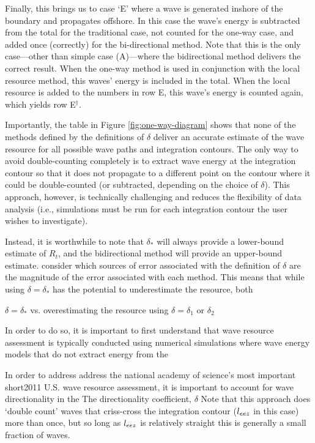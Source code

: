 Finally, this brings us to case `E' where a wave is generated inshore of the boundary and propagates offshore. In this case the wave's energy is subtracted from the total for the traditional case, not counted for the one-way case, and added once (correctly) for the bi-directional method. Note that this is the only case—other than simple case (A)—where the bidirectional method delivers the correct result. When the one-way method is used in conjunction with the local resource method, this waves' energy is included in the total.
When the local resource is added to the numbers in row E, this wave's energy is counted again, which yields row E$^\dagger$.

Importantly, the table in Figure \ref{fig:one-way-diagram} shows that none of the methods defined by the definitions of $\delta$ deliver an accurate estimate of the wave resource for all possible wave paths and integration contours. The only way to avoid double-counting completely is to extract wave energy at the integration contour so that it does not propagate to a different point on the contour where it could be double-counted (or subtracted, depending on the choice of $\delta$). This approach, however, is technically challenging and reduces the flexibility of data analysis (i.e., simulations must be run for each integration contour the user wishes to investigate).

Instead, it is worthwhile to note that $\delta_*$ will always provide a lower-bound estimate of $R_t$, and the bidirectional method will provide an upper-bound estimate. consider which sources of error associated with the definition of $\delta$ are the magnitude of the error associated with each method. 
This means that while using $\delta = \delta_*$ has the potential to underestimate the resource, both 

$\delta = \delta_*$ vs. overestimating the resource using $\delta = \delta_1$ or $\delta_2$ 




In order to do so, it is important to first understand that wave resource assessment is typically conducted using numerical simulations where wave energy models that do not extract energy from the 



In order to address address the national academy of science's 
most important short2011 U.S. wave resource assessment, it is important to account for wave directionality in the The directionality coefficient, $\delta$ Note that this approach does `double count' waves that criss-cross the integration contour ($l_{eez}$ in this case) more than once, but so long as $l_{eez}$ is relatively straight this is generally a small fraction of waves.

